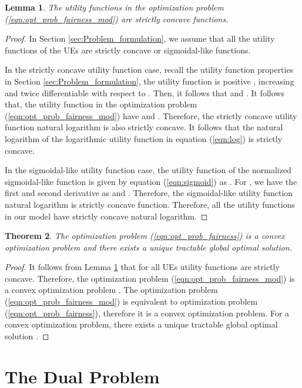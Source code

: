\documentclass[conference]{IEEEtran}
\newtheorem{thm}{Theorem}[section]
\newtheorem{lem}[thm]{Lemma}
\begin{document}
\begin{lem}\label{lem:concavity}
The utility functions  in the optimization problem (\ref{eqn:opt_prob_fairness_mod}) are strictly concave functions. 
\end{lem}
\begin{proof}
In Section \ref{sec:Problem_formulation}, we assume that all the utility functions of the UEs are strictly concave or sigmoidal-like functions. 

In the strictly concave utility function case, recall the utility function properties in Section \ref{sec:Problem_formulation}, the utility function is positive , increasing and twice differentiable with respect to . Then, it follows that  and . It follows that, the utility function  in the optimization problem (\ref{eqn:opt_prob_fairness_mod}) have  and . Therefore, the strictly concave utility function  natural logarithm   is also strictly concave. It follows that the natural logarithm  of the logarithmic utility function in equation (\ref{eqn:log}) is strictly concave.

In the sigmoidal-like utility function case, the utility function of the normalized sigmoidal-like function is given by equation (\ref{eqn:sigmoid}) as . For , we have the first and second derivative as  and . Therefore, the sigmoidal-like utility function  natural logarithm   is strictly concave function. Therefore, all the utility functions in our model have strictly concave natural logarithm.
\end{proof}
\begin{thm}\label{thm:global_soln}
The optimization problem (\ref{eqn:opt_prob_fairness}) is a convex optimization problem and there exists a unique tractable global optimal solution. 
\end{thm}
\begin{proof}
It follows from Lemma \ref{lem:concavity} that for all UEs utility functions are strictly concave. Therefore, the optimization problem (\ref{eqn:opt_prob_fairness_mod}) is a convex optimization problem \cite{Boyd2004}. The optimization problem (\ref{eqn:opt_prob_fairness_mod}) is equivalent to optimization problem (\ref{eqn:opt_prob_fairness}), therefore it is a convex optimization problem. For a convex optimization problem, there exists a unique tractable global optimal solution \cite{Boyd2004}.
\end{proof}

\section{The Dual Problem}\label{sec:Dual}
\end{document}
